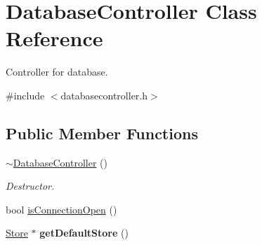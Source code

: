 \hypertarget{class_database_controller}{\section{\-Database\-Controller \-Class \-Reference}
\label{class_database_controller}
}


\-Controller for database.  




{\ttfamily \#include $<$databasecontroller.\-h$>$}

\subsection*{\-Public \-Member \-Functions}
\begin{DoxyCompactItemize}
\item 
\hyperlink{class_database_controller_a7815dd17cfa10ea03ff4a700fcde7c13}{$\sim$\-Database\-Controller} ()
\begin{DoxyCompactList}\small\item\em \-Destructor. \end{DoxyCompactList}\item 
bool \hyperlink{class_database_controller_ac3dfc1a7e25dce68b01684f23747e748}{is\-Connection\-Open} ()
\item 
\hypertarget{class_database_controller_a216cd964dca3a4eb77e26b8d089ea7f2}{\hyperlink{class_store}{\-Store} $\ast$ {\bfseries get\-Default\-Store} ()}\label{class_database_controller_a216cd964dca3a4eb77e26b8d089ea7f2}


\end{DoxyCompactItemize}
